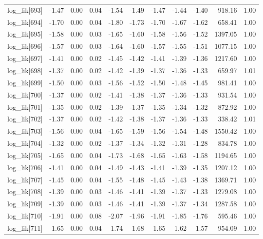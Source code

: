 \begin{table}[ht]
\begin{tabular}{rrrrrrrrrrr}
  log\_lik[693] & -1.47 & 0.00 & 0.04 & -1.54 & -1.49 & -1.47 & -1.44 & -1.40 & 918.16 & 1.00 \\ 
  log\_lik[694] & -1.70 & 0.00 & 0.04 & -1.80 & -1.73 & -1.70 & -1.67 & -1.62 & 658.41 & 1.00 \\ 
  log\_lik[695] & -1.58 & 0.00 & 0.03 & -1.65 & -1.60 & -1.58 & -1.56 & -1.52 & 1397.05 & 1.00 \\ 
  log\_lik[696] & -1.57 & 0.00 & 0.03 & -1.64 & -1.60 & -1.57 & -1.55 & -1.51 & 1077.15 & 1.00 \\ 
  log\_lik[697] & -1.41 & 0.00 & 0.02 & -1.45 & -1.42 & -1.41 & -1.39 & -1.36 & 1217.60 & 1.00 \\ 
  log\_lik[698] & -1.37 & 0.00 & 0.02 & -1.42 & -1.39 & -1.37 & -1.36 & -1.33 & 659.97 & 1.01 \\ 
  log\_lik[699] & -1.50 & 0.00 & 0.03 & -1.56 & -1.52 & -1.50 & -1.48 & -1.45 & 981.41 & 1.00 \\ 
  log\_lik[700] & -1.37 & 0.00 & 0.02 & -1.41 & -1.38 & -1.37 & -1.36 & -1.33 & 931.54 & 1.00 \\ 
  log\_lik[701] & -1.35 & 0.00 & 0.02 & -1.39 & -1.37 & -1.35 & -1.34 & -1.32 & 872.92 & 1.00 \\ 
  log\_lik[702] & -1.37 & 0.00 & 0.02 & -1.42 & -1.38 & -1.37 & -1.36 & -1.33 & 338.42 & 1.01 \\ 
  log\_lik[703] & -1.56 & 0.00 & 0.04 & -1.65 & -1.59 & -1.56 & -1.54 & -1.48 & 1550.42 & 1.00 \\ 
  log\_lik[704] & -1.32 & 0.00 & 0.02 & -1.37 & -1.34 & -1.32 & -1.31 & -1.28 & 834.78 & 1.00 \\ 
  log\_lik[705] & -1.65 & 0.00 & 0.04 & -1.73 & -1.68 & -1.65 & -1.63 & -1.58 & 1194.65 & 1.00 \\ 
  log\_lik[706] & -1.41 & 0.00 & 0.04 & -1.49 & -1.43 & -1.41 & -1.39 & -1.35 & 1207.12 & 1.00 \\ 
  log\_lik[707] & -1.45 & 0.00 & 0.04 & -1.55 & -1.48 & -1.45 & -1.43 & -1.38 & 1369.71 & 1.00 \\ 
  log\_lik[708] & -1.39 & 0.00 & 0.03 & -1.46 & -1.41 & -1.39 & -1.37 & -1.33 & 1279.08 & 1.00 \\ 
  log\_lik[709] & -1.39 & 0.00 & 0.03 & -1.46 & -1.41 & -1.39 & -1.37 & -1.34 & 1287.58 & 1.00 \\ 
  log\_lik[710] & -1.91 & 0.00 & 0.08 & -2.07 & -1.96 & -1.91 & -1.85 & -1.76 & 595.46 & 1.00 \\ 
  log\_lik[711] & -1.65 & 0.00 & 0.04 & -1.74 & -1.68 & -1.65 & -1.62 & -1.57 & 954.09 & 1.00 \\ 

\end{tabular}
\end{table}
